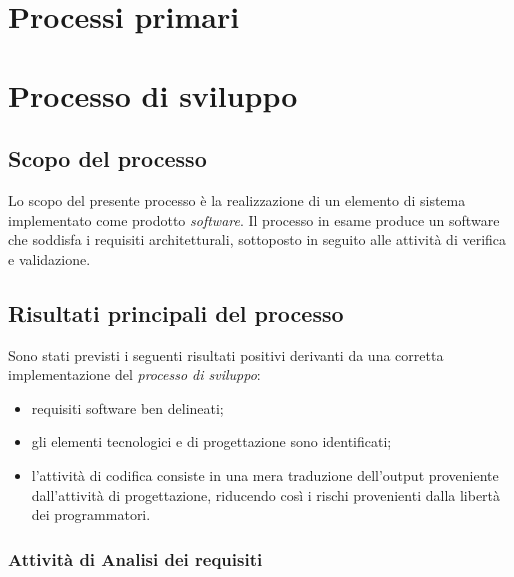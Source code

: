 

\section{Processi primari}
	\section{Processo di sviluppo}
        \subsection{Scopo del processo}
        Lo scopo del presente processo \`e la realizzazione di un elemento di sistema implementato come prodotto
        \textit{software}. Il processo in esame produce un software che soddisfa i requisiti architetturali, sottoposto
        in seguito alle attivit\`a di verifica e validazione.
        \subsection{Risultati principali del processo}
        Sono stati previsti i seguenti risultati positivi derivanti da una corretta implementazione del \textit{processo di sviluppo}:
        \begin{itemize}
          \item requisiti software ben delineati;
          \item gli elementi tecnologici e di progettazione sono identificati;
          \item l'attivit\`a di codifica consiste in una mera traduzione dell'output proveniente dall'attivit\`a di progettazione,
            riducendo cos\`i i rischi provenienti dalla libert\`a dei programmatori.
        \end{itemize}
        
		\subsubsection{Attività di Analisi dei requisiti}
